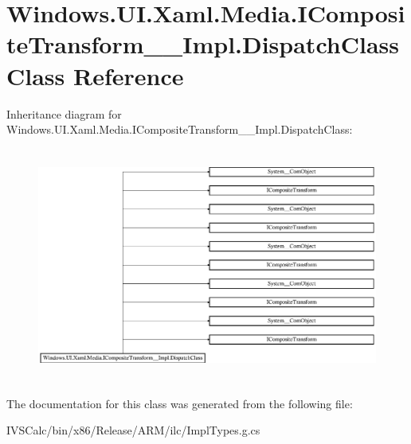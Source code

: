 \hypertarget{class_windows_1_1_u_i_1_1_xaml_1_1_media_1_1_i_composite_transform_____impl_1_1_dispatch_class}{}\section{Windows.\+U\+I.\+Xaml.\+Media.\+I\+Composite\+Transform\+\_\+\+\_\+\+Impl.\+Dispatch\+Class Class Reference}
\label{class_windows_1_1_u_i_1_1_xaml_1_1_media_1_1_i_composite_transform_____impl_1_1_dispatch_class}
Inheritance diagram for Windows.\+U\+I.\+Xaml.\+Media.\+I\+Composite\+Transform\+\_\+\+\_\+\+Impl.\+Dispatch\+Class\+:\begin{figure}[H]
\begin{center}
\leavevmode
\includegraphics[height=7.738694cm]{class_windows_1_1_u_i_1_1_xaml_1_1_media_1_1_i_composite_transform_____impl_1_1_dispatch_class}
\end{center}
\end{figure}


The documentation for this class was generated from the following file\+:\begin{DoxyCompactItemize}
\item 
I\+V\+S\+Calc/bin/x86/\+Release/\+A\+R\+M/ilc/Impl\+Types.\+g.\+cs\end{DoxyCompactItemize}
